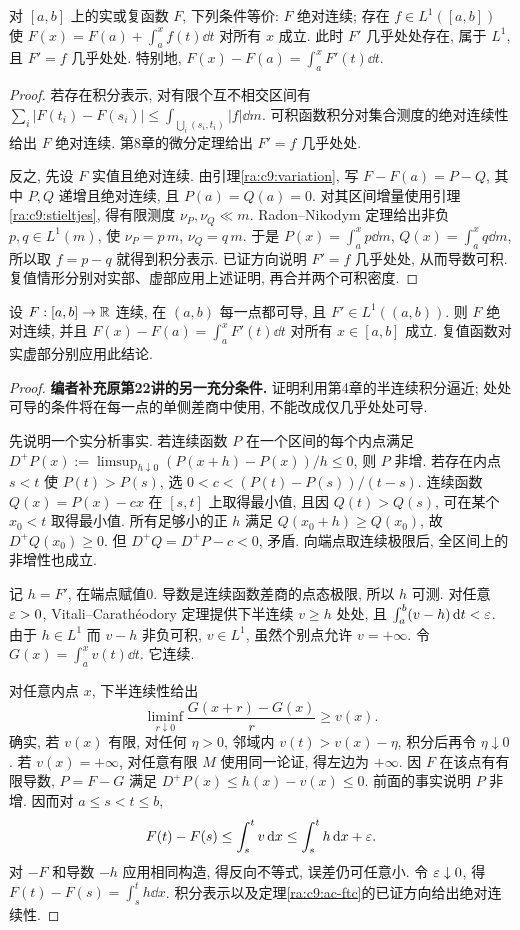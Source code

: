 \begin{theorem}\label{ra:c9:ac-ftc}
对 $[a,b]$ 上的实或复函数 $F$, 下列条件等价: $F$ 绝对连续; 存在 $f\in L^1([a,b])$ 使 $F(x)=F(a)+\int_a^x f(t)\dd t$ 对所有 $x$ 成立. 此时 $F'$ 几乎处处存在, 属于 $L^1$, 且 $F'=f$ 几乎处处. 特别地, $F(x)-F(a)=\int_a^xF'(t)\dd t$.
\end{theorem}
\begin{proof}
若存在积分表示, 对有限个互不相交区间有
$\sum_i|F(t_i)-F(s_i)|\le\int_{\bigcup_i(s_i,t_i)}|f|\dd m$. 可积函数积分对集合测度的绝对连续性给出 $F$ 绝对连续. 第8章的微分定理给出 $F'=f$ 几乎处处.

反之, 先设 $F$ 实值且绝对连续. 由引理\ref{ra:c9:variation}, 写 $F-F(a)=P-Q$, 其中 $P,Q$ 递增且绝对连续, 且 $P(a)=Q(a)=0$. 对其区间增量使用引理\ref{ra:c9:stieltjes}, 得有限测度 $\nu_P,\nu_Q\ll m$. Radon--Nikodym 定理给出非负 $p,q\in L^1(m)$, 使 $\nu_P=p\,m$, $\nu_Q=q\,m$. 于是 $P(x)=\int_a^xp\dd m$, $Q(x)=\int_a^xq\dd m$, 所以取 $f=p-q$ 就得到积分表示. 已证方向说明 $F'=f$ 几乎处处, 从而导数可积. 复值情形分别对实部、虚部应用上述证明, 再合并两个可积密度.
\end{proof}

\begin{theorem}\label{ra:c9:everywhere-ftc}
设 $F:[a,b]\to\mathbb R$ 连续, 在 $(a,b)$ 每一点都可导, 且 $F'\in L^1((a,b))$. 则 $F$ 绝对连续, 并且 $F(x)-F(a)=\int_a^x F'(t)\dd t$ 对所有 $x\in[a,b]$ 成立. 复值函数对实虚部分别应用此结论.
\end{theorem}
\begin{proof}
\textbf{编者补充原第22讲的另一充分条件.} 证明利用第4章的半连续积分逼近; 处处可导的条件将在每一点的单侧差商中使用, 不能改成仅几乎处处可导.

先说明一个实分析事实. 若连续函数 $P$ 在一个区间的每个内点满足
$D^+P(x):=\limsup_{h\downarrow0}(P(x+h)-P(x))/h\le0$, 则 $P$ 非增. 若存在内点 $s<t$ 使 $P(t)>P(s)$, 选 $0<c<(P(t)-P(s))/(t-s)$. 连续函数 $Q(x)=P(x)-cx$ 在 $[s,t]$ 上取得最小值, 且因 $Q(t)>Q(s)$, 可在某个 $x_0<t$ 取得最小值. 所有足够小的正 $h$ 满足 $Q(x_0+h)\ge Q(x_0)$, 故 $D^+Q(x_0)\ge0$. 但 $D^+Q=D^+P-c<0$, 矛盾. 向端点取连续极限后, 全区间上的非增性也成立.

记 $h=F'$, 在端点赋值0. 导数是连续函数差商的点态极限, 所以 $h$ 可测. 对任意 $\varepsilon>0$, Vitali--Carath\'eodory 定理提供下半连续 $v\ge h$ 处处, 且 $\int_a^b(v-h)\,\mathrm d t<\varepsilon$. 由于 $h\in L^1$ 而 $v-h$ 非负可积, $v\in L^1$, 虽然个别点允许 $v=+\infty$. 令 $G(x)=\int_a^xv(t)\dd t$. 它连续.

对任意内点 $x$, 下半连续性给出
\[
 \liminf_{r\downarrow0}\frac{G(x+r)-G(x)}r\ge v(x).
\]
确实, 若 $v(x)$ 有限, 对任何 $\eta>0$, 邻域内 $v(t)>v(x)-\eta$, 积分后再令 $\eta\downarrow0$. 若 $v(x)=+\infty$, 对任意有限 $M$ 使用同一论证, 得左边为 $+\infty$. 因 $F$ 在该点有有限导数, $P=F-G$ 满足 $D^+P(x)\le h(x)-v(x)\le0$. 前面的事实说明 $P$ 非增. 因而对 $a\le s<t\le b$,
\[
 F(t)-F(s)\le\int_s^tv\,\mathrm d x
 \le\int_s^th\,\mathrm d x+\varepsilon.
\]
对 $-F$ 和导数 $-h$ 应用相同构造, 得反向不等式, 误差仍可任意小. 令 $\varepsilon\downarrow0$, 得 $F(t)-F(s)=\int_s^th\dd x$. 积分表示以及定理\ref{ra:c9:ac-ftc}的已证方向给出绝对连续性.
\end{proof}

